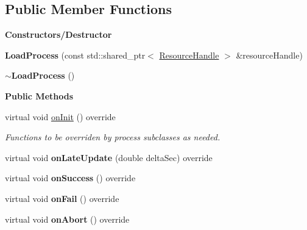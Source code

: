 \subsection*{Public Member Functions}
\begin{Indent}\textbf{ Constructors/\+Destructor}\par
\begin{DoxyCompactItemize}
\item 
\mbox{\label{classrev_1_1_load_process_a249cd84625ea0946a2106bb19d415428}} 
{\bfseries Load\+Process} (const std\+::shared\+\_\+ptr$<$ \mbox{\hyperlink{classrev_1_1_resource_handle}{Resource\+Handle}} $>$ \&resource\+Handle)
\item 
\mbox{\label{classrev_1_1_load_process_af796052508aac2974decf4fa838e9da7}} 
{\bfseries $\sim$\+Load\+Process} ()
\end{DoxyCompactItemize}
\end{Indent}
\begin{Indent}\textbf{ Public Methods}\par
\begin{DoxyCompactItemize}
\item 
\mbox{\label{classrev_1_1_load_process_aa2216a585c3deff892ef5faebe2a736f}} 
virtual void \mbox{\hyperlink{classrev_1_1_load_process_aa2216a585c3deff892ef5faebe2a736f}{on\+Init}} () override
\begin{DoxyCompactList}\small\item\em Functions to be overriden by process subclasses as needed. \end{DoxyCompactList}\item 
\mbox{\label{classrev_1_1_load_process_ada0825aa3a4beeda9f64e3c5587c065a}} 
virtual void {\bfseries on\+Late\+Update} (double delta\+Sec) override
\item 
\mbox{\label{classrev_1_1_load_process_a39e0f64689cbad5089d5700a6d60eb4f}} 
virtual void {\bfseries on\+Success} () override
\item 
\mbox{\label{classrev_1_1_load_process_a688425979ad57f23f51a1a076357e8d1}} 
virtual void {\bfseries on\+Fail} () override
\item 
\mbox{\label{classrev_1_1_load_process_a49c85382cf0e3c49020cd1c82a6de38c}} 
virtual void {\bfseries on\+Abort} () override
\end{DoxyCompactItemize}
\end{Indent}

